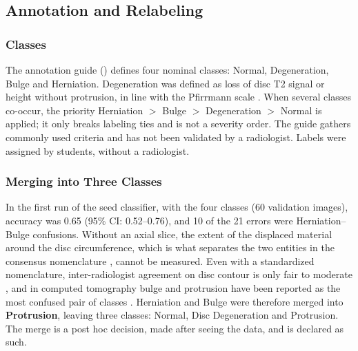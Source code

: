 \subsection{Annotation and Relabeling}
\label{sec:annotation}
\subsubsection{Classes}
The annotation guide () defines four nominal classes: Normal, Degeneration, Bulge and Herniation. Degeneration was defined as loss of disc T2 signal or height without protrusion, in line with the Pfirrmann scale \cite{pfirrmann2001}. When several classes co-occur, the priority Herniation $>$ Bulge $>$ Degeneration $>$ Normal is applied; it only breaks labeling ties and is not a severity order. The guide gathers commonly used criteria and has not been validated by a radiologist. Labels were assigned by students, without a radiologist.

\subsubsection{Merging into Three Classes}
In the first run of the seed classifier, with the four classes (60 validation images), accuracy was 0.65 (95\% CI: 0.52--0.76), and 10 of the 21 errors were Herniation--Bulge confusions. Without an axial slice, the extent of the displaced material around the disc circumference, which is what separates the two entities in the consensus nomenclature \cite{fardon2014}, cannot be measured. Even with a standardized nomenclature, inter-radiologist agreement on disc contour is only fair to moderate \cite{arana2011}, and in computed tomography bulge and protrusion have been reported as the most confused pair of classes \cite{gao2025}. Herniation and Bulge were therefore merged into \textbf{Protrusion}, leaving three classes: Normal, Disc Degeneration and Protrusion. The merge is a post hoc decision, made after seeing the data, and is declared as such.

